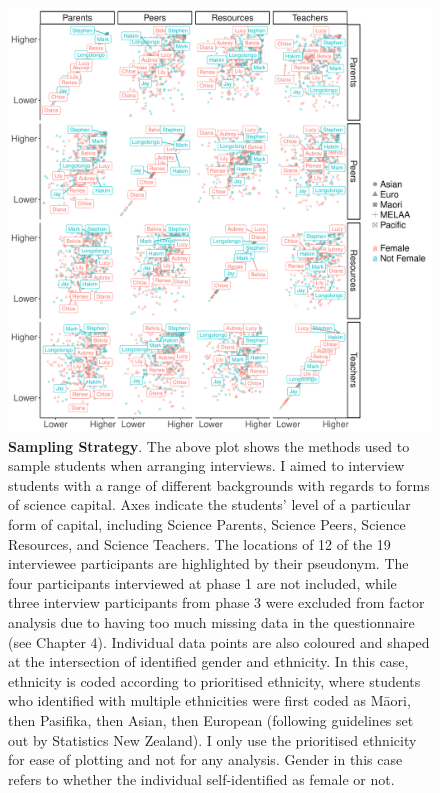 \begin{figure}[ht]
\centering
\includegraphics[width=\textwidth]{C6 - Experiences of Science Capital/ScienceFactors_FacetPlot.pdf}
\caption{\label{fig:ScienceFactors_C6}\textbf{Sampling Strategy}. The above plot shows the methods used to sample students when arranging interviews. I aimed to interview students with a range of different backgrounds with regards to forms of science capital. Axes indicate the students' level of a particular form of capital, including Science Parents, Science Peers, Science Resources, and Science Teachers. The locations of 12 of the 19 interviewee participants are highlighted by their pseudonym. The four participants interviewed at phase 1 are not included, while three interview participants from phase 3 were excluded from factor analysis due to having too much missing data in the questionnaire (see Chapter 4). Individual data points are also coloured and shaped at the intersection of identified gender and ethnicity. In this case, ethnicity is coded according to prioritised ethnicity, where students who identified with multiple ethnicities were first coded as M\={a}ori, then Pasifika, then Asian, then European (following guidelines set out by Statistics New Zealand). I only use the prioritised ethnicity for ease of plotting and not for any analysis. Gender in this case refers to whether the individual self-identified as female or not. }
\end{figure}

